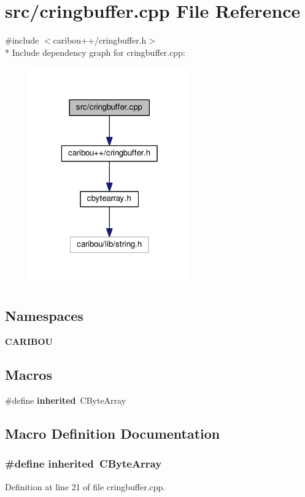\section{src/cringbuffer.cpp File Reference}
\label{cringbuffer_8cpp}
{\ttfamily \#include $<$caribou++/cringbuffer.\-h$>$}\\*
Include dependency graph for cringbuffer.\-cpp\-:\nopagebreak
\begin{figure}[H]
\begin{center}
\leavevmode
\includegraphics[width=196pt]{cringbuffer_8cpp__incl}
\end{center}
\end{figure}
\subsection*{Namespaces}
\begin{DoxyCompactItemize}
\item 
{\bf C\-A\-R\-I\-B\-O\-U}
\end{DoxyCompactItemize}
\subsection*{Macros}
\begin{DoxyCompactItemize}
\item 
\#define {\bf inherited}~C\-Byte\-Array
\end{DoxyCompactItemize}


\subsection{Macro Definition Documentation}
\subsubsection[{inherited}]{\setlength{\rightskip}{0pt plus 5cm}\#define inherited~C\-Byte\-Array}\label{cringbuffer_8cpp_a3920e3b7cb0909b941b2409493acf8f1}


Definition at line 21 of file cringbuffer.\-cpp.

